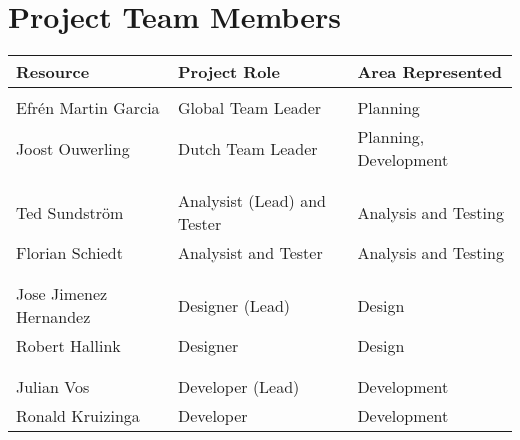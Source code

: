 \clearpage

\section{Project Team Members}

\begin{table}[h]
\begin{tabular}{lll}
\textbf{Resource} & \textbf{Project Role} & \textbf{Area Represented} \\  \hline \\

Efrén Martin Garcia & Global Team Leader & Planning \\
Joost Ouwerling & Dutch Team Leader & Planning, Development \\ \\
\hdashline \\
Ted Sundström & Analysist (Lead) and Tester & Analysis and Testing\\
Florian Schiedt & Analysist and Tester & Analysis and Testing \\ \\
\hdashline \\
Jose Jimenez	Hernandez & Designer (Lead) & Design \\
Robert Hallink & Designer & Design \\ \\
\hdashline \\
Julian Vos & Developer (Lead) & Development \\
Ronald Kruizinga & Developer & Development \\

\end{tabular}
\end{table}
